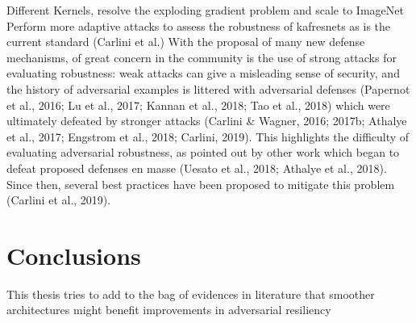 \documentclass[LaM,binding=0.6cm]{./packages/sapthesis/sapthesis}
\begin{document}
    Different Kernels, resolve the exploding gradient problem and scale to ImageNet
    Perform more adaptive attacks to assess the robustness of kafresnets as is the current standard (Carlini et al.)
    With the proposal of many new defense mechanisms, of great concern in the community is the use
    of strong attacks for evaluating robustness: weak attacks can give a misleading sense of security, and
    the history of adversarial examples is littered with adversarial defenses (Papernot et al., 2016; Lu
    et al., 2017; Kannan et al., 2018; Tao et al., 2018) which were ultimately defeated by stronger attacks
    (Carlini \& Wagner, 2016; 2017b; Athalye et al., 2017; Engstrom et al., 2018; Carlini, 2019). This
    highlights the difficulty of evaluating adversarial robustness, as pointed out by other work which
    began to defeat proposed defenses en masse (Uesato et al., 2018; Athalye et al., 2018). Since then,
    several best practices have been proposed to mitigate this problem (Carlini et al., 2019).


\chapter{Conclusions}

    This thesis tries to add to the bag of evidences in literature that smoother architectures might benefit improvements in adversarial resiliency
    
    
\appendix


\backmatter
\end{document}
